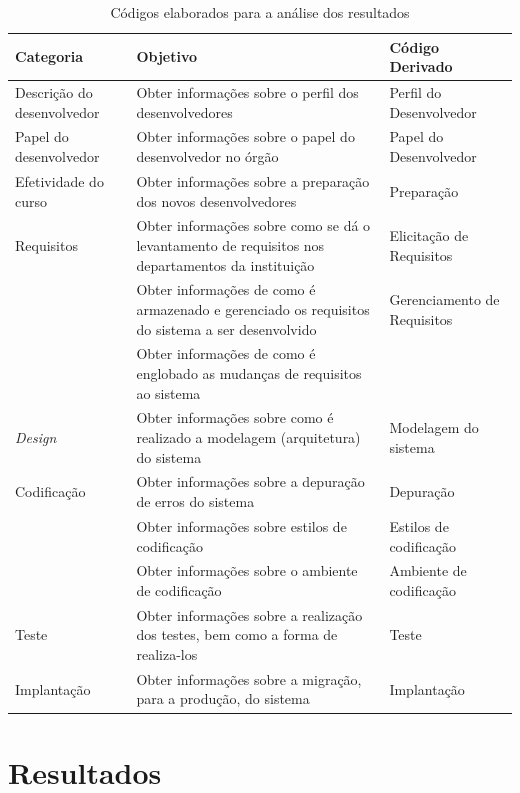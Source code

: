 \begin{table}[h]
	\centering
	\begin{tabular}{|m{4.8cm} | m{4.8cm} | m{4.8cm}|}
		\hline
		\textbf{Categoria} & \textbf{Objetivo} & 
		\textbf{Código Derivado} \\ \hline
		Descrição do desenvolvedor & Obter informações sobre o perfil dos desenvolvedores & 
		Perfil do Desenvolvedor \\ \hline
		Papel do desenvolvedor & Obter informações sobre o papel do desenvolvedor no órgão & 
		Papel do Desenvolvedor \\ \hline 
		Efetividade do curso & Obter informações sobre a preparação dos novos desenvolvedores & 
		Preparação \\ \hline 
		Requisitos & Obter informações sobre como se dá o levantamento de requisitos nos departamentos da instituição & Elicitação de Requisitos \\ \cline{2-3}
		& Obter informações de como é armazenado e gerenciado os requisitos do sistema a ser desenvolvido &
		 Gerenciamento de Requisitos \\ \cline{2-2}
		& Obter informações de como é englobado as mudanças de requisitos ao sistema & \\ \hline
		\textit{Design} & Obter informações sobre como é realizado a modelagem (arquitetura) do sistema &
		Modelagem do sistema \\ \hline
		Codificação & Obter informações sobre a depuração de erros do sistema & Depuração \\ \cline{2-3}
		& Obter informações sobre estilos de codificação & Estilos de codificação \\ \cline{2-3}
		& Obter informações sobre o ambiente de codificação & Ambiente de codificação \\ \hline
		Teste & Obter informações sobre a realização dos testes, bem como a forma de realiza-los &
		Teste \\ \hline
		Implantação & Obter informações sobre a migração, para a produção, do sistema & Implantação \\
		\hline
	\end{tabular}

	\caption{Códigos elaborados para a análise dos resultados}
	\label{tab01}
\end{table}

\chapter[Resultados]{Resultados}

